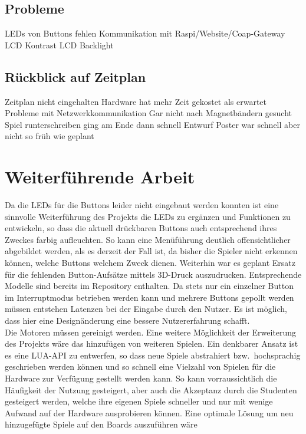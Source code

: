 \documentclass[a4paper]{article}
\begin{document}
  \subsection{Probleme}
  LEDs von Buttons fehlen
  Kommunikation mit Raspi/Website/Coap-Gateway
  LCD Kontrast
  LCD Backlight
  \subsection{Rückblick auf Zeitplan}
  Zeitplan nicht eingehalten
  Hardware hat mehr Zeit gekostet als erwartet
  Probleme mit Netzwerkkommunikation
  Gar nicht nach Magnetbändern gesucht
  Spiel runterschreiben ging am Ende dann schnell
  Entwurf Poster war schnell aber nicht so früh wie geplant

\section{Weiterführende Arbeit}
  \label{sec:further}
  Da die LEDs für die Buttons leider nicht eingebaut werden konnten ist eine
  sinnvolle Weiterführung des Projekts die LEDs zu ergänzen und Funktionen zu
  entwickeln, so dass die aktuell drückbaren Buttons auch entsprechend ihres
  Zweckes farbig aufleuchten. So kann eine Menüführung deutlich offensichtlicher
  abgebildet werden, als es derzeit der Fall ist, da bisher die Spieler nicht
  erkennen können, welche Buttons welchem Zweck dienen. Weiterhin war es geplant
  Ersatz für die fehlenden Button-Aufsätze mittels 3D-Druck auszudrucken.
  Entsprechende Modelle sind bereits im Repository enthalten. Da stets nur ein
  einzelner Button im Interruptmodus betrieben werden kann und mehrere Buttons
  gepollt werden müssen entstehen Latenzen bei der Eingabe durch den Nutzer. Es
  ist möglich, dass hier eine Designänderung eine bessere Nutzererfahrung
  schafft.\\
  Die Motoren müssen gereinigt werden.
  Eine weitere Möglichkeit der Erweiterung des Projekts wäre das hinzufügen von
  weiteren Spielen. Ein denkbarer Ansatz ist es eine LUA-API zu entwerfen, so
  dass neue Spiele abstrahiert bzw.\ hochsprachig geschrieben werden können und so
  schnell eine Vielzahl von Spielen für die Hardware zur Verfügung gestellt
  werden kann. So kann vorraussichtlich die Häufigkeit der Nutzung gesteigert,
  aber auch die Akzeptanz durch die Studenten gesteigert werden, welche ihre
  eigenen Spiele schneller und nur mit wenige Aufwand auf der Hardware
  ausprobieren können.
  Eine optimale Lösung um neu hinzugefügte Spiele auf den Boards auszuführen wäre
\end{document}
